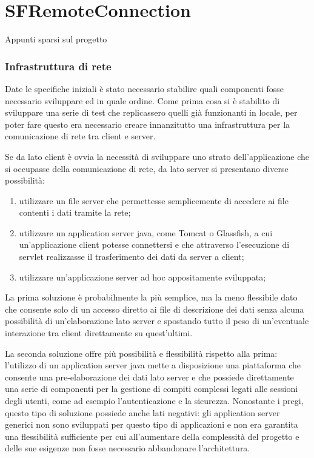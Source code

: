 
\chapter{SFRemoteConnection}

Appunti sparsi sul progetto

\subsection{Infrastruttura di rete} 
\label{sub:rete}
Date le specifiche iniziali \`e stato necessario stabilire quali componenti fosse necessario sviluppare ed in quale ordine. 
Come prima cosa si \`e stabilito di sviluppare una serie di test che replicassero quelli gi\`a funzionanti in locale, per poter fare questo era necessario creare innanzitutto una infrastruttura per la comunicazione di rete tra client e server.

Se da lato client \`e ovvia la necessit\`a di sviluppare uno strato dell'applicazione che si occupasse della comunicazione di rete, da lato server si presentano diverse possibilit\`a: 
\begin{enumerate}
	\item  utilizzare un file server che permettesse semplicemente di accedere ai file contenti i dati tramite la rete;
	\item  utilizzare un application server java, come Tomcat o Glassfish, a cui un'applicazione client potesse connettersi e che attraverso l'esecuzione di servlet realizzasse il trasferimento dei dati da server a client;
	\item  utilizzare un'applicazione server ad hoc appositamente sviluppata;
\end{enumerate}

La prima soluzione \`e probabilmente la pi\`u semplice, ma la meno flessibile dato che consente solo di un accesso diretto ai file di descrizione dei dati senza alcuna possibilit\`a di un'elaborazione lato server e spostando tutto il peso di un'eventuale interazione tra client direttamente su quest'ultimi.

La seconda soluzione offre pi\`u possibilit\`a e flessibilit\`a rispetto alla prima: l'utilizzo di un application server java mette a disposizione una piattaforma che consente una pre-elaborazione dei dati lato server e che possiede direttamente una serie di componenti per la gestione di compiti complessi legati alle sessioni degli utenti, come ad esempio l'autenticazione e la sicurezza. Nonostante i pregi, questo tipo di soluzione possiede anche lati negativi: gli application server generici non sono sviluppati per questo tipo di applicazioni e non era garantita una flessibilit\`a sufficiente per cui all'aumentare della complessit\`a del progetto e delle sue esigenze non fosse necessario abbandonare l'architettura. 

